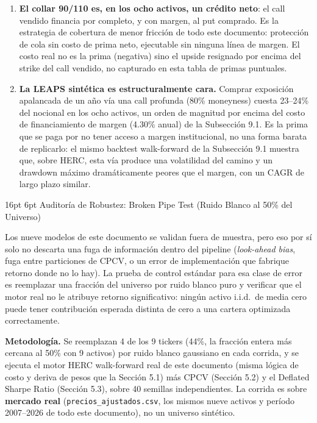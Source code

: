 \documentclass[11pt,a4paper]{article}
\makeatletter
\renewcommand\section{\@startsection{section}{1}{\z@}%
  {16pt \@plus 3pt \@minus 2pt}%
  {6pt}%
  {\centering\large\bfseries\color{navyblue}}}
\makeatother
\begin{document}
\begin{enumerate}
\item \textbf{El collar 90/110 es, en los ocho activos, un crédito neto}: el call vendido financia por completo, y con margen, al put comprado. Es la estrategia de cobertura de menor fricción de todo este documento: protección de cola sin costo de prima neto, ejecutable sin ninguna línea de margen. El costo real no es la prima (negativa) sino el upside resignado por encima del strike del call vendido, no capturado en esta tabla de primas puntuales.
\item \textbf{La LEAPS sintética es estructuralmente cara.} Comprar exposición apalancada de un año vía una call profunda (80\% moneyness) cuesta 23--24\% del nocional en los ocho activos, un orden de magnitud por encima del costo de financiamiento de margen (4.30\% anual) de la Subsección 9.1. Es la prima que se paga por no tener acceso a margen institucional, no una forma barata de replicarlo: el mismo backtest walk-forward de la Subsección 9.1 muestra que, sobre HERC, esta vía produce una volatilidad del camino y un drawdown máximo dramáticamente peores que el margen, con un CAGR de largo plazo similar.
\end{enumerate}

\section{Auditoría de Robustez: Broken Pipe Test (Ruido Blanco al 50\% del Universo)}
\label{sec:brokenpipe}

Los nueve modelos de este documento se validan fuera de muestra, pero eso por sí solo no
descarta una fuga de información dentro del pipeline (\textit{look-ahead bias}, fuga entre
particiones de CPCV, o un error de implementación que fabrique retorno donde no lo hay). La
prueba de control estándar para esa clase de error es reemplazar una fracción del universo
por ruido blanco puro y verificar que el motor real no le atribuye retorno significativo:
ningún activo i.i.d.\ de media cero puede tener contribución esperada distinta de cero a
una cartera optimizada correctamente.

\textbf{Metodología.} Se reemplazan 4 de los 9 tickers (44\%, la fracción entera más
cercana al 50\% con 9 activos) por ruido blanco gaussiano en cada corrida, y se ejecuta el
motor HERC walk-forward real de este documento (misma lógica de costo y deriva de pesos que
la Sección 5.1) más CPCV (Sección 5.2) y el Deflated Sharpe Ratio (Sección 5.3), sobre 40
semillas independientes. La corrida es sobre \textbf{mercado real}
(\texttt{precios\_ajustados.csv}, los mismos nueve activos y período 2007--2026 de todo este
documento), no un universo sintético.
\end{document}
